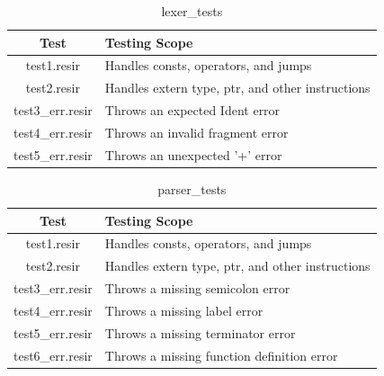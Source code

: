 \documentclass[11pt, a4paper]{article}
\begin{document}
\medskip

\begin{table}[H]
    \centering
    \begin{tabular}{| c | l |}
        \hline
        \textbf{Test} & \textbf{Testing Scope} \\
        \hline
        test1.resir                  & Handles consts, operators, and jumps  \\
        test2.resir                 & Handles extern type, ptr, and other instructions       \\
        test3\_err.resir              & Throws an expected Ident error       \\
        test4\_err.resir              & Throws an invalid fragment error       \\
        test5\_err.resir              & Throws an unexpected '+' error       \\
        \hline
    \end{tabular}
    \caption{lexer\_tests}
\end{table}

\bigskip

\begin{table}[H]
    \centering
    \begin{tabular}{| c | l |}
        \hline
        \textbf{Test} & \textbf{Testing Scope} \\
        \hline
        test1.resir                  & Handles consts, operators, and jumps  \\
        test2.resir                 & Handles extern type, ptr, and other instructions       \\
        test3\_err.resir              & Throws a missing semicolon error       \\
        test4\_err.resir              & Throws a missing label error       \\
        test5\_err.resir              & Throws a missing terminator error       \\
        test6\_err.resir              & Throws a missing function definition error       \\
        \hline
    \end{tabular}
    \caption{parser\_tests}
\end{table}

\bigskip
\end{document}
